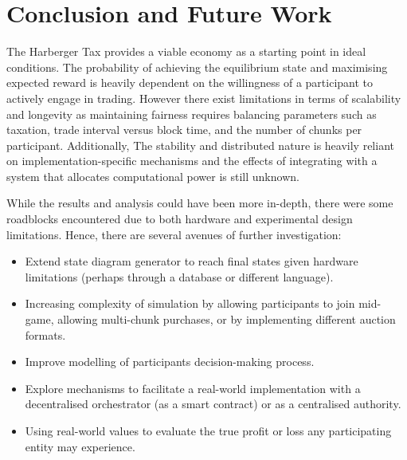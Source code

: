 \chapter{Conclusion and Future Work}


The Harberger Tax provides a viable economy as a starting point in ideal conditions. The probability of achieving the equilibrium state and maximising expected reward is heavily dependent on the willingness of a participant to actively engage in trading. However there exist limitations in terms of scalability and longevity as maintaining fairness requires balancing parameters such as taxation, trade interval versus block time, and the number of chunks per participant. Additionally, The stability and distributed nature is heavily reliant on implementation-specific mechanisms and the effects of integrating with a system that allocates computational power is still unknown.

While the results and analysis could have been more in-depth, there were some roadblocks encountered due to both hardware and experimental design limitations. Hence, there are several avenues of further investigation:

\begin{itemize}
    \item Extend state diagram generator to reach final states given hardware limitations (perhaps through a database or different language).
    \item Increasing complexity of simulation by allowing participants to join mid-game, allowing multi-chunk purchases, or by implementing different auction formats.
    \item Improve modelling of participants decision-making process.
    \item Explore mechanisms to facilitate a real-world implementation with a decentralised orchestrator (as a smart contract) or as a centralised authority.
    \item Using real-world values to evaluate the true profit or loss any participating entity may experience.
\end{itemize}

